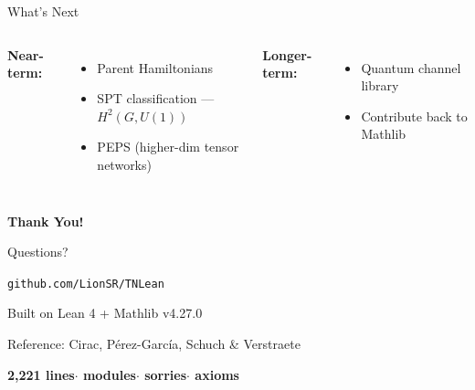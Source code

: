 \documentclass[aspectratio=169,10pt]{beamer}
\begin{document}
\begin{frame}{What's Next}
\vspace{-0.3em}
\begin{columns}[T]
{\small\textbf{Near-term:}}
\begin{itemize}\itemsep0.05em
  \item {\small Parent Hamiltonians}
  \item {\small SPT classification --- $H^2(G,U(1))$}
  \item {\small PEPS (higher-dim tensor networks)}
\end{itemize}

{\small\textbf{Longer-term:}}
\begin{itemize}\itemsep0.05em
  \item {\small Quantum channel library}
  \item {\small Contribute back to Mathlib}
\end{itemize}
\end{columns}

\vspace{0.5em}
\begin{center}
\end{center}
\end{frame}

\begin{frame}
\begin{center}
\vspace{1em}
\Huge\textbf{\textcolor{leangreen}{Thank You!}}

\vspace{1em}
\LARGE Questions?

\vspace{1.2em}
\large\texttt{github.com/LionSR/TNLean}

\vspace{0.4em}
\normalsize Built on Lean 4 + Mathlib v4.27.0

\vspace{0.3em}
{\small Reference: Cirac, P{\'e}rez-Garc{\'i}a, Schuch \& Verstraete \cite{Cirac2021Matrix}}

\vspace{0.8em}
\textcolor{leangreen}{\textbf{2,221 lines\quad$\cdot$ modules\quad$\cdot$ sorries\quad$\cdot$ axioms}}
\end{center}
\end{frame}
\end{document}
